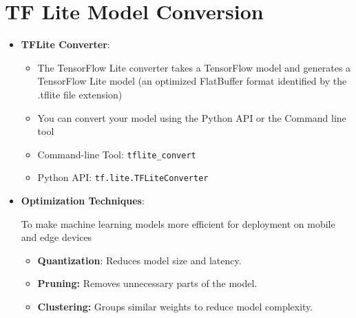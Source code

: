 \section{TF Lite Model Conversion}
{ 
	
	
\begin{itemize}
	\item \textbf{TFLite Converter}:
	\begin{itemize}
		\item The TensorFlow Lite converter takes a TensorFlow model and generates a TensorFlow Lite model (an optimized FlatBuffer format identified by the .tflite file extension)
		\item You can convert your model using the Python API or the Command line tool
		\item Command-line Tool: \texttt{tflite\_convert}
		\item Python API: \texttt{tf.lite.TFLiteConverter}
	\end{itemize}
	\item \textbf{Optimization Techniques}:
	
	To make machine learning models more efficient for deployment on mobile and edge devices
	\begin{itemize}
		\item \textbf{Quantization}: Reduces model size and latency.
		\item \textbf{Pruning:} Removes unnecessary parts of the model.
		\item \textbf{Clustering:} Groups similar weights to reduce model complexity.
	\end{itemize}
\end{itemize}
}

